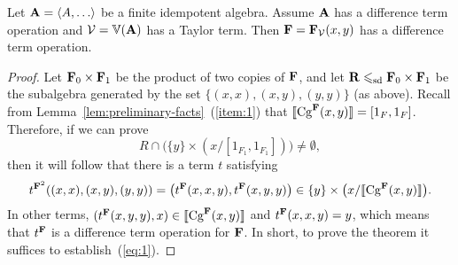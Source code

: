 \begin{theorem}
\label{thm:main-result}
Let $\bA = \<A, \dots\>$ be a finite idempotent algebra.
Assume $\mathbf{A}$ has a difference term operation and 
$\mathcal{V} = \operatorname{\mathbb{V}}(\mathbf{A})$ has a Taylor term.
Then $\mathbf{F} = \mathbf{F}_{\mathcal{V}}(x,y)$ has a difference term operation.
\end{theorem}
\begin{proof}
Let $\mathbf{F}_0 \times \mathbf{F}_1$ be the product of two copies of $\mathbf{F}$,
and let $\mathbf{R} \leqslant_{\mathrm{sd}} \mathbf{F}_0 \times \mathbf{F}_1$ be the subalgebra generated
by the set $\{(x, x), (x, y), (y, y)\}$ (as above).
Recall from Lemma~\ref{lem:preliminary-facts}~(\ref{item:1}) that
$\llbracket \operatorname{Cg}^{\mathbf{F}}(x,y) \rrbracket = [1_{F},1_{F}]$.  Therefore, if we can prove 
\begin{equation}
  \label{eq:1}
R \cap \bigl(\{y\} \times (x/[1_{F_1},1_{F_1}])\bigr) \neq \emptyset,
\end{equation}
then it will follow that there is a term $t$ satisfying
\[
t^{\mathbf{F}^2}((x,x),(x,y),(y,y)) =\bigl(t^{\mathbf{F}}(x,x,y), t^{\mathbf{F}}(x,y,y)\bigr) \in
\{y\} \times \bigl(x/\llbracket \operatorname{Cg}^{\mathbf{F}}(x,y) \rrbracket\bigr).
\]
In other terms,
$(t^{\mathbf{F}}(x,y,y),x) \in \llbracket \operatorname{Cg}^{\mathbf{F}}(x,y) \rrbracket$ and
$t^{\mathbf{F}}(x,x,y) = y$, which means that $t^{\mathbf{F}}$ is a difference term operation 
for $\mathbf{F}$.  In short, to prove the theorem it suffices to establish~(\ref{eq:1}). 



\end{proof}
